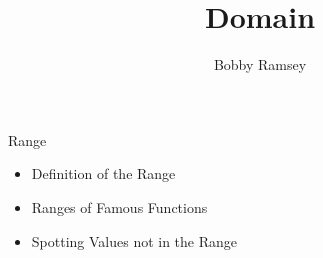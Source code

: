 \documentclass{ximera}
\author{Bobby Ramsey}
\title{Domain}
\begin{document}
\begin{abstract}
\end{abstract}
\maketitle


\begin{objectives}

\item Range
\begin{itemize}
	\item Definition of the Range
	\item Ranges of Famous Functions 
	\item Spotting Values not in the Range
\end{itemize}



\end{objectives}
\end{document}
